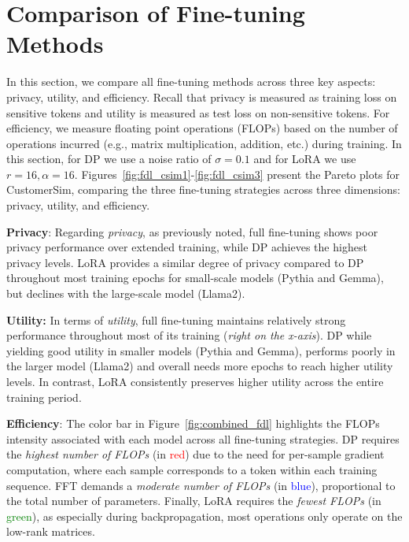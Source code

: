 \section{Comparison of Fine-tuning Methods}
\label{sec:comparison}

In this section, we compare all fine-tuning methods across three key aspects: privacy, utility, and efficiency.
Recall that privacy is measured as training loss on sensitive tokens and utility is measured as test loss on non-sensitive tokens.
For efficiency, we measure floating point operations (FLOPs) based on the number of operations incurred (e.g., matrix multiplication, addition, etc.) during training.
In this section, for DP we use a noise ratio of $\sigma = 0.1$ and for LoRA we use $r=16,\alpha=16 $. Figures~\ref{fig:fdl_csim1}-\ref{fig:fdl_csim3} present the Pareto plots for CustomerSim, comparing the three fine-tuning strategies across three dimensions: privacy, utility, and efficiency. 

\noindent
\textbf{Privacy}: Regarding \textit{privacy}, as previously noted, full fine-tuning shows poor privacy performance over extended training, while DP achieves the highest privacy levels.
LoRA provides a similar degree of privacy compared to DP throughout most training epochs for small-scale models (Pythia and Gemma), but declines with the large-scale model (Llama2).

\noindent
\textbf{Utility:} In terms of \textit{utility}, full fine-tuning maintains relatively strong performance throughout most of its training (\textit{right on the x-axis}).
DP while yielding good utility in smaller models (Pythia and Gemma), performs poorly in the larger model (Llama2) and overall needs more epochs to reach higher utility levels.
In contrast, LoRA consistently preserves higher utility across the entire training period.


\noindent
\textbf{Efficiency}: The color bar in Figure~\ref{fig:combined_fdl} highlights the FLOPs intensity associated with each model across all fine-tuning strategies.
DP requires the \textit{highest number of FLOPs} (in \textcolor{red}{red}) due to the need for per-sample gradient computation, where each sample corresponds to a token within each training sequence.
FFT demands a \textit{moderate number of FLOPs} (in \textcolor{blue}{blue}), proportional to the total number of parameters.
Finally, LoRA requires the \textit{fewest FLOPs} (in \textcolor{green}{green}), as especially during backpropagation, most operations only operate on the low-rank matrices.

